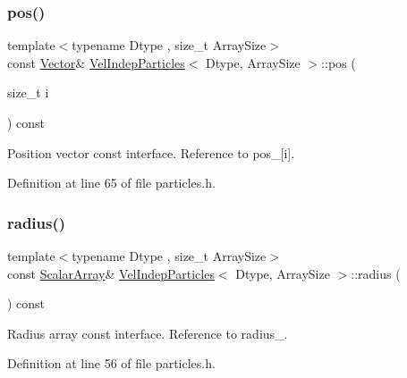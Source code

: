 \subsubsection{\texorpdfstring{pos()}{pos()}\hspace{0.1cm}{\footnotesize\ttfamily [2/2]}}
{\footnotesize\ttfamily template$<$typename Dtype , size\+\_\+t Array\+Size$>$ \\
const \mbox{\hyperlink{class_vel_indep_particles_aa7e03da81f44941c06abf43ec2180079}{Vector}}\& \mbox{\hyperlink{class_vel_indep_particles}{Vel\+Indep\+Particles}}$<$ Dtype, Array\+Size $>$\+::pos (\begin{DoxyParamCaption}\item[{size\+\_\+t}]{i }\end{DoxyParamCaption}) const\hspace{0.3cm}{\ttfamily [inline]}}



Position vector const interface. Reference to pos\+\_\+\mbox{[}i\mbox{]}. 



Definition at line 65 of file particles.\+h.

\mbox{\label{class_vel_indep_particles_a764cb67485dbd51be3509177df6c355a}} 
\subsubsection{\texorpdfstring{radius()}{radius()}\hspace{0.1cm}{\footnotesize\ttfamily [1/2]}}
{\footnotesize\ttfamily template$<$typename Dtype , size\+\_\+t Array\+Size$>$ \\
const \mbox{\hyperlink{class_vel_indep_particles_abd6e6b0ffbbab4ebc078efd77f6a365a}{Scalar\+Array}}\& \mbox{\hyperlink{class_vel_indep_particles}{Vel\+Indep\+Particles}}$<$ Dtype, Array\+Size $>$\+::radius (\begin{DoxyParamCaption}{ }\end{DoxyParamCaption}) const\hspace{0.3cm}{\ttfamily [inline]}}



Radius array const interface. Reference to radius\+\_\+. 



Definition at line 56 of file particles.\+h.

